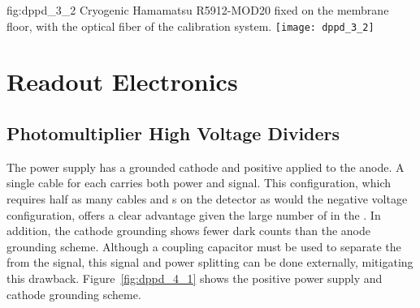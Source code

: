 \begin{dunefigure}{fig:dppd_3_2}
{Cryogenic Hamamatsu R5912-MOD20  fixed on the membrane floor, with the optical fiber of the calibration system.}
\texttt{[image: dppd\_3\_2]}
\end{dunefigure}

\section{Readout Electronics}
\label{sec:fddp-pd-4}

\subsection{Photomultiplier High Voltage Dividers}
\label{sec:fddp-pd-4.1}

The   power supply has a grounded cathode and positive  applied to the anode. A single cable for each  carries both power and signal. This configuration, which requires half as many cables and \fdth{}s on the detector as would the negative voltage configuration, offers a clear advantage given the large number of  in the . In addition, the cathode grounding shows fewer dark counts than the anode grounding scheme. Although a coupling capacitor must be used to separate the  from the  signal, this signal and power splitting can be done externally, mitigating this drawback.  Figure~\ref{fig:dppd_4_1} shows the positive power supply and cathode grounding scheme.

